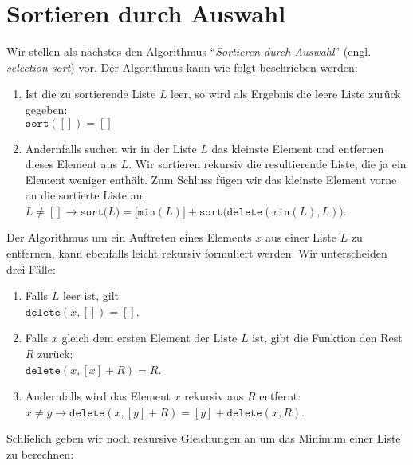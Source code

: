 \section{Sortieren durch Auswahl}
Wir stellen als n\"achstes den Algorithmus ``\emph{Sortieren durch Auswahl}''
(engl. \emph{selection sort}) vor.  Der Algorithmus kann wie folgt beschrieben werden:
\begin{enumerate}
\item Ist die zu sortierende Liste $L$ leer, so wird als Ergebnis
      die leere Liste zur\"uck gegeben: \\[0.2cm]
      \hspace*{1.3cm} $\mathtt{sort}([]) = []$
\item Andernfalls suchen wir in der Liste $L$ das kleinste Element und entfernen dieses
      Element aus $L$.  Wir sortieren rekursiv die resultierende Liste, die ja ein Element
      weniger enth\"alt.  Zum Schluss f\"ugen wir das kleinste Element vorne an die sortierte
      Liste an: \\[0.2cm]
      \hspace*{1.3cm} 
      $L \not= [] \rightarrow \mathtt{sort}\bigl(L\bigr) = \bigl[\texttt{min}(L)\bigr]
      + \mathtt{sort}\bigl(\mathtt{delete}(\texttt{min}(L), L)\bigr)$.
\end{enumerate}
Der Algorithmus um ein Auftreten eines Elements $x$ aus einer Liste $L$ zu entfernen, kann ebenfalls leicht rekursiv
formuliert werden. Wir unterscheiden drei F\"alle:
\begin{enumerate}
\item Falls $L$ leer ist, gilt \\[0.2cm]
      \hspace*{1.3cm} $\mathtt{delete}(x, []) = []$.
\item Falls $x$ gleich dem ersten Element der Liste $L$ ist, gibt die Funktion den Rest
      $R$ zur\"uck: \\[0.2cm]
      \hspace*{1.3cm} 
      $\mathtt{delete}(x, [x] + R) = R$.
\item Andernfalls wird das Element $x$ rekursiv aus $R$ entfernt: \\[0.2cm]
      \hspace*{1.3cm}   
      $x \not = y \rightarrow \mathtt{delete}(x, [y] + R) = [y] + \mathtt{delete}(x,R)$.
\end{enumerate}
Schlie\3lich geben wir noch rekursive Gleichungen an um das Minimum einer Liste zu berechnen:
